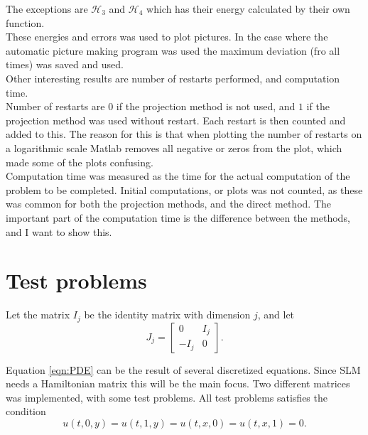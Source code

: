 The exceptions are $\mathcal{H}_3$ and $\mathcal{H}_4$ which has their energy calculated by their own function. \\

These energies and errors was used to plot pictures. In the case where the automatic picture making program was used the maximum deviation (fro all times) was saved and used. \\

Other interesting results are number of restarts performed, and computation time. \\
Number of restarts are $0$ if the projection method is not used, and $1$ if the projection method was used without restart. Each restart is then counted and added to this. The reason for this is that when plotting the number of restarts on a logarithmic scale Matlab removes all negative or zeros from the plot, which made some of the plots confusing.\\
Computation time was measured as the time for the actual computation of the problem to be completed. Initial computations, or plots was not counted, as these was common for both the projection methods, and the direct method. The important part of the computation time is the difference between the methods, and I want to show this.


\section{Test problems} %
Let the matrix $I_j$ be the identity matrix with dimension $j$, and let 
\begin{equation}
J_j = 
\begin{bmatrix}
0&I_j\\-I_j&0
\end{bmatrix}.
\end{equation}

Equation \eqref{eqn:PDE} can be the result of several discretized equations. Since SLM needs a Hamiltonian matrix this will be the main focus. Two different matrices was implemented, with some test problems. All test problems satisfies the condition $$u(t,0,y) = u(t,1,y) = u(t,x,0) = u(t,x,1) = 0.$$ 

